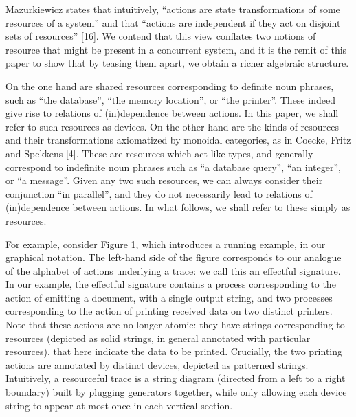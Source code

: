 \documentclass[10pt,a4paper]{article}
\begin{document}
 
 
Mazurkiewicz states that intuitively, “actions are state transformations of some resources of a system” and that “actions are independent if they act on disjoint sets of resources” [16]. We contend that this view conflates two notions of resource that might be present in a concurrent system, and it is the remit of this paper to show that by teasing them apart, we obtain a richer algebraic structure.\par
 
 
 
On the one hand are shared resources corresponding to definite noun phrases, such as “the database”, “the memory location”, or “the printer”. These indeed give rise to relations of (in)dependence between actions. In this paper, we shall refer to such resources as devices. On the other hand are the kinds of resources and their transformations axiomatized by monoidal categories, as in Coecke, Fritz and Spekkens [4]. These are resources which act like types, and generally correspond to indefinite noun phrases such as “a database query”, “an integer”, or “a message”. Given any two such resources, we can always consider their conjunction “in parallel”, and they do not necessarily lead to relations of (in)dependence between actions. In what follows, we shall refer to these simply as resources.\par
 
 
 
For example, consider Figure 1, which introduces a running example, in our graphical notation. The left-hand side of the figure corresponds to our analogue of the alphabet of actions underlying a trace: we call this an effectful signature. In our example, the effectful signature contains a process corresponding to the action of emitting a document, with a single output string, and two processes corresponding to the action of printing received data on two distinct printers. Note that these actions are no longer atomic: they have strings corresponding to resources (depicted as solid strings, in general annotated with particular resources), that here indicate the data to be printed. Crucially, the two printing actions are annotated by distinct devices, depicted as patterned strings. Intuitively, a resourceful trace is a string diagram (directed from a left to a right boundary) built by plugging generators together, while only allowing each device string to appear at most once in each vertical section.\par
 
\end{document}
